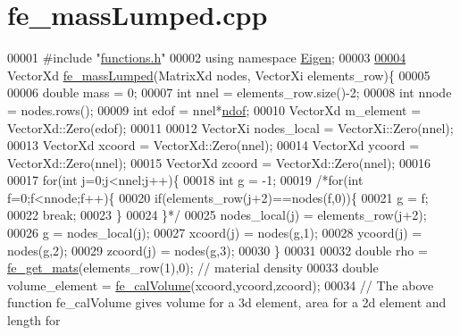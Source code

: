 \hypertarget{fe__mass_lumped_8cpp_source}{}\section{fe\+\_\+mass\+Lumped.\+cpp}
\label{fe__mass_lumped_8cpp_source}

\begin{DoxyCode}
00001 \textcolor{preprocessor}{#include "\hyperlink{functions_8h}{functions.h}"}
00002 \textcolor{keyword}{using namespace }\hyperlink{namespace_eigen}{Eigen};
00003 
\hyperlink{fe__mass_lumped_8cpp_aa34a87447bf9fa851463ce99101a7054}{00004} VectorXd \hyperlink{fe__mass_lumped_8cpp_aa34a87447bf9fa851463ce99101a7054}{fe\_massLumped}(MatrixXd nodes, VectorXi elements\_row)\{
00005 
00006     \textcolor{keywordtype}{double} mass = 0;
00007     \textcolor{keywordtype}{int} nnel = elements\_row.size()-2;
00008     \textcolor{keywordtype}{int} nnode = nodes.rows();
00009     \textcolor{keywordtype}{int} edof = nnel*\hyperlink{_global_variables_8h_aa789fe4d8a13fd0990b630909430d5d0}{ndof};
00010     VectorXd m\_element = VectorXd::Zero(edof);
00011 
00012     VectorXi nodes\_local = VectorXi::Zero(nnel);
00013     VectorXd xcoord = VectorXd::Zero(nnel);
00014     VectorXd ycoord = VectorXd::Zero(nnel);
00015     VectorXd zcoord = VectorXd::Zero(nnel);
00016 
00017     \textcolor{keywordflow}{for}(\textcolor{keywordtype}{int} j=0;j<nnel;j++)\{
00018       \textcolor{keywordtype}{int} g = -1;
00019       \textcolor{comment}{/*for(int f=0;f<nnode;f++)\{}
00020 \textcolor{comment}{        if(elements\_row(j+2)==nodes(f,0))\{}
00021 \textcolor{comment}{          g = f;}
00022 \textcolor{comment}{          break;}
00023 \textcolor{comment}{        \}}
00024 \textcolor{comment}{      \}*/}
00025       nodes\_local(j) = elements\_row(j+2);
00026       g = nodes\_local(j);
00027       xcoord(j) = nodes(g,1);
00028       ycoord(j) = nodes(g,2);
00029       zcoord(j) = nodes(g,3);
00030     \}
00031 
00032     \textcolor{keywordtype}{double} rho = \hyperlink{functions_8h_af7ffbad6dfcc99fc88b130c1a7b1720a}{fe\_get\_mats}(elements\_row(1),0); \textcolor{comment}{// material density}
00033     \textcolor{keywordtype}{double} volume\_element = \hyperlink{functions_8h_a00f586c9a4bc56ec486776402fc26605}{fe\_calVolume}(xcoord,ycoord,zcoord);
00034     \textcolor{comment}{// The above function fe\_calVolume gives volume for a 3d element, area for a 2d element and length for
}
\end{DoxyCode}
